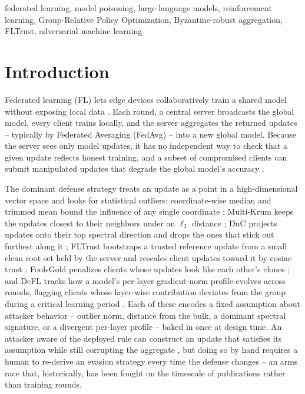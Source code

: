 \documentclass[conference]{IEEEtran}
\begin{document}
\begin{IEEEkeywords}
federated learning, model poisoning, large language models, reinforcement learning, Group-Relative Policy Optimization, Byzantine-robust aggregation, FLTrust, adversarial machine learning
\end{IEEEkeywords}

\section{Introduction}

Federated learning (FL) lets edge devices collaboratively train a shared model without exposing local data \cite{fedavg}. Each round, a central server broadcasts the global model, every client trains locally, and the server aggregates the returned updates -- typically by Federated Averaging (FedAvg) -- into a new global model. Because the server sees only model updates, it has no independent way to check that a given update reflects honest training, and a subset of compromised clients can submit manipulated updates that degrade the global model's accuracy \cite{bagdasaryan2020,bhagoji2019}.

The dominant defense strategy treats an update as a point in a high-dimensional vector space and looks for statistical outliers: coordinate-wise median and trimmed mean bound the influence of any single coordinate \cite{byzantine}; Multi-Krum keeps the updates closest to their neighbors under an $\ell_2$ distance \cite{krum}; DnC projects updates onto their top spectral direction and drops the ones that stick out furthest along it \cite{dnc}; FLTrust bootstraps a trusted reference update from a small clean root set held by the server and rescales client updates toward it by cosine trust \cite{fltrust}; FoolsGold penalizes clients whose updates look like each other's clones \cite{foolsgold}; and DeFL tracks how a model's per-layer gradient-norm profile evolves across rounds, flagging clients whose layer-wise contribution deviates from the group during a critical learning period \cite{defl}. Each of these encodes a fixed assumption about attacker behavior -- outlier norm, distance from the bulk, a dominant spectral signature, or a divergent per-layer profile -- baked in once at design time. An attacker aware of the deployed rule can construct an update that satisfies its assumption while still corrupting the aggregate \cite{fang2020}, but doing so by hand requires a human to re-derive an evasion strategy every time the defense changes -- an arms race that, historically, has been fought on the timescale of publications rather than training rounds.
\end{document}
